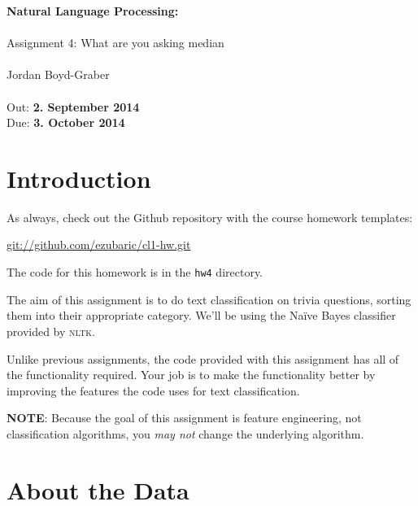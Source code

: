 \documentclass[11pt]{article}
\begin{document}
\begin{center}
{\Large{\textbf{ Natural Language Processing:  }}}\\
\mbox{}\\
{\Large{Assignment 4: What are you asking median}}\\
\mbox{}\\
{\large{Jordan Boyd-Graber}}\\
\mbox{}\\
{\large{Out: \textbf{2. September 2014}\\Due: \textbf{3. October 2014}}}\\
\end{center}


{}

\section*{Introduction} %
\label{sec:introduction}
As always, check out the Github repository with the course homework templates:

\url{git://github.com/ezubaric/cl1-hw.git}

The code for this homework is in the \texttt{hw4} directory.

The aim of this assignment is to do text classification on trivia questions, sorting them into their appropriate category.  We'll be using the Na\"ive Bayes classifier provided by \textsc{nltk}.

Unlike previous assignments, the code provided with this assignment has all of the functionality required.  Your job is to make the functionality better by improving the features the code uses for text classification.  

{\bf NOTE}: Because the goal of this assignment is feature engineering, not classification algorithms, you \emph{may not} change the underlying algorithm.  

\section*{About the Data}
\end{document}
